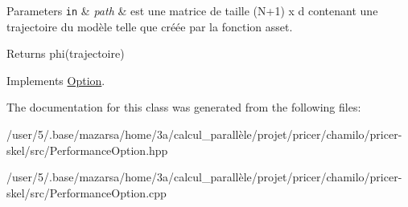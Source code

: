 \begin{DoxyParams}[1]{Parameters}
\mbox{\tt in}  & {\em path} & est une matrice de taille (N+1) x d contenant une trajectoire du modèle telle que créée par la fonction asset. \\
\hline
\end{DoxyParams}
\begin{DoxyReturn}{Returns}
phi(trajectoire) 
\end{DoxyReturn}


Implements \hyperlink{classOption_abe90882a11f5436077425249e3f32204}{Option}.



The documentation for this class was generated from the following files\-:\begin{DoxyCompactItemize}
\item 
/user/5/.\-base/mazarsa/home/3a/calcul\-\_\-parallèle/projet/pricer/chamilo/pricer-\/skel/src/Performance\-Option.\-hpp\item 
/user/5/.\-base/mazarsa/home/3a/calcul\-\_\-parallèle/projet/pricer/chamilo/pricer-\/skel/src/Performance\-Option.\-cpp\end{DoxyCompactItemize}

